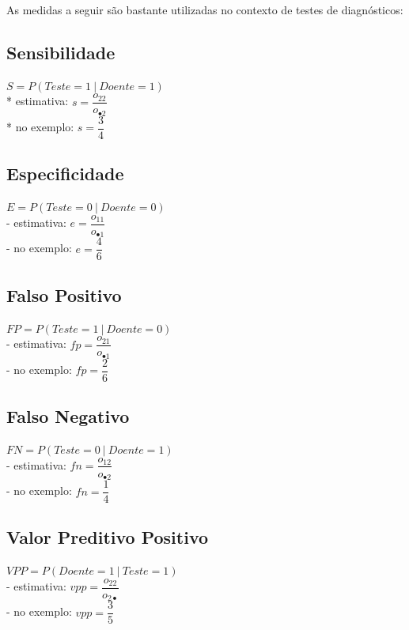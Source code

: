 \documentclass[
]{book}
\begin{document}
As medidas a seguir são bastante utilizadas no contexto de testes de diagnósticos:

\subsection{Sensibilidade}\label{sensibilidade}

\(S = P(Teste = 1 ~|~ Doente = 1)\)\\
* estimativa: \(s = \dfrac{o_{22}}{o_{\bullet 2}}\)\\
* no exemplo: \(s = \dfrac{3}{4}\)

\subsection{Especificidade}\label{especificidade}

\(E = P(Teste = 0 ~|~ Doente = 0)\)\\
- estimativa: \(e = \dfrac{o_{11}}{o_{\bullet 1}}\)\\
- no exemplo: \(e = \dfrac{4}{6}\)

\subsection{Falso Positivo}\label{falso-positivo}

\(FP = P(Teste = 1 ~|~ Doente = 0)\)\\
- estimativa: \(fp = \dfrac{o_{21}}{o_{\bullet 1}}\)\\
- no exemplo: \(fp = \dfrac{2}{6}\)

\subsection{Falso Negativo}\label{falso-negativo}

\(FN = P(Teste = 0 ~|~ Doente = 1)\)\\
- estimativa: \(fn = \dfrac{o_{12}}{o_{\bullet 2}}\)\\
- no exemplo: \(fn = \dfrac{1}{4}\)

\subsection{Valor Preditivo Positivo}\label{valor-preditivo-positivo}

\(VPP=P(Doente=1~|~Teste=1)\)\\
- estimativa: \(vpp = \dfrac{o_{22}}{o_{2 \bullet}}\)\\
- no exemplo: \(vpp = \dfrac{3}{5}\)
\end{document}
